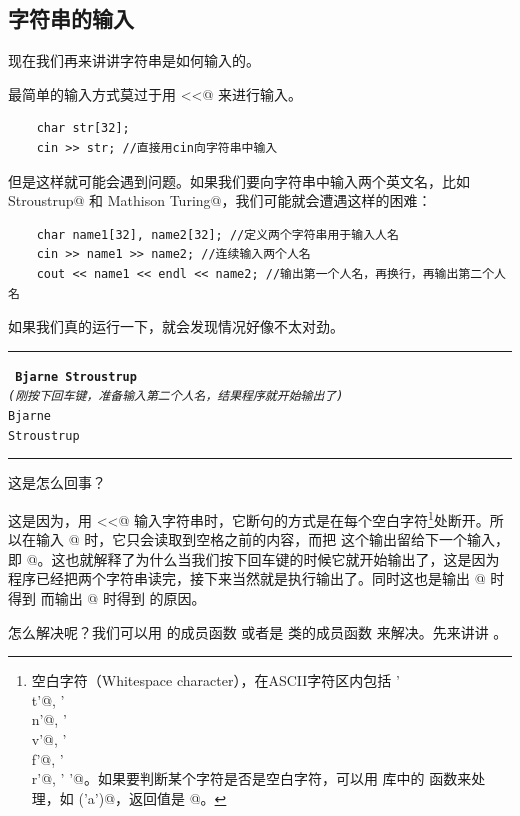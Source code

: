 \subsection*{字符串的输入}
现在我们再来讲讲字符串是如何输入的。\par
最简单的输入方式莫过于用 \lstinline@cin<<@ 来进行输入。
\begin{lstlisting}
    char str[32];
    cin >> str; //直接用cin向字符串中输入
\end{lstlisting}
但是这样就可能会遇到问题。如果我们要向字符串中输入两个英文名，比如 \lstinline@Bjarne Stroustrup@ 和 \lstinline@Alan Mathison Turing@，我们可能就会遭遇这样的困难：
\begin{lstlisting}
    char name1[32], name2[32]; //定义两个字符串用于输入人名
    cin >> name1 >> name2; //连续输入两个人名
    cout << name1 << endl << name2; //输出第一个人名，再换行，再输出第二个人名
\end{lstlisting}
如果我们真的运行一下，就会发现情况好像不太对劲。\\\noindent\rule{\linewidth}{.2pt}\texttt{
\textbf{Bjarne Stroustrup}\\\textit{(刚按下回车键，准备输入第二个人名，结果程序就开始输出了)}\\
Bjarne\\
Stroustrup
}\\\noindent\rule{\linewidth}{.2pt}
这是怎么回事？\par
这是因为，用 \lstinline@cin<<@ 输入字符串时，它断句的方式是在每个空白字符\footnote{空白字符（Whitespace character），在ASCII字符区内包括 \lstinline@'\\t'@, \lstinline@'\\n'@, \lstinline@'\\v'@, \lstinline@'\\f'@, \lstinline@'\\r'@, \lstinline@' '@。如果要判断某个字符是否是空白字符，可以用 \lstinline@cctype@ 库中的 \lstinline@isspace@ 函数来处理，如 \lstinline@isspace('a')@，返回值是 @。}处断开。所以在输入 @ 时，它只会读取到空格之前的内容，而把 \lstinline@Stroustrup@ 这个输出留给下一个输入，即 @。这也就解释了为什么当我们按下回车键的时候它就开始输出了，这是因为程序已经把两个字符串读完，接下来当然就是执行输出了。同时这也是输出 @ 时得到 \lstinline@Bjarne@ 而输出 @ 时得到 \lstinline@Stroustrup@ 的原因。\par
怎么解决呢？我们可以用 \lstinline@cin@ 的成员函数 \lstinline@get@ 或者是 \lstinline@istream@ 类的成员函数 \lstinline@getline@ 来解决。先来讲讲 \lstinline@getline@。\par

